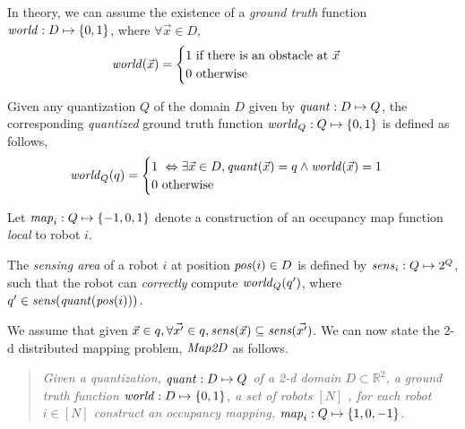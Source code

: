 In theory, we can assume the existence of a \emph{ground truth} function $\mathit{world} : D\mapsto \left\{0,1\right\}$, where $\forall \Vec{x} \in D$, $$\world(\Vec{x}) = \begin{cases}
                                                                                                                                                                        1\ \mbox{if there is an obstacle at }\Vec{x}\\
                                                                                                                                                                        0\ \mbox{otherwise}
\end{cases}
$$

Given any quantization $Q$ of the domain $D$ given by $\mathit{quant}:D\mapsto Q$, the corresponding \emph{quantized} ground truth function
$\mathit{world}_Q : Q \mapsto \left\{0,1\right\}$ is defined as follows,  $$\world_Q(q) = \begin{cases}
                                                                                      1\ \Leftrightarrow \exists \Vec{x}\in D, \qfunc(\Vec{x}) = q \wedge \world(\Vec{x}) = 1 \\
                                                                                      0\ \mbox{otherwise}
\end{cases}
$$

Let $\mathit{map}_i:Q\mapsto \left\{-1,0,1\right\}$ denote a construction of an occupancy map function \emph{local} to robot $i$.  %

\begin{definition}
    The \emph{sensing area} of a robot $i$ at position $\mathit{pos}(i)\in D$ is defined by $\mathit{sens}_i: Q \mapsto 2^{Q}$, such that the robot can \emph{correctly} compute $\mathit{world}_Q(q^\prime)$, where $q^\prime \in \mathit{sens}(\mathit{quant}(\mathit{pos}(i))) $.
\end{definition}

We assume that given $\Vec{x} \in q, \forall \Vec{x^\prime} \in q, \mathit{sens}(\Vec{x}) \subseteq \mathit{sens}(\Vec{x^\prime})$. We can now state the 2-d distributed mapping problem, $\mathit{Map2D}$ as follows. \begin{quote}
{\em Given a quantization, $\mathit{quant}:D\mapsto Q$ of a 2-d domain $D\subset \mathbb{R}^2$, a ground truth function $\mathit{world}:D \mapsto \left\{0,1\right\}$, a set of robots $[N]$ , for each robot $i \in [N]$ construct an occupancy mapping, $\mathit{map}_i: Q \mapsto \left\{1,0,-1\right\}$.
}
\end{quote}

